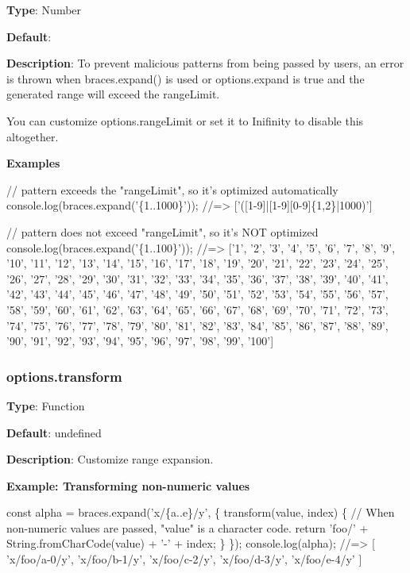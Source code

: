 {\bfseries Type}\+: {\ttfamily Number}

{\bfseries Default}\+: {}

{\bfseries Description}\+: To prevent malicious patterns from being passed by users, an error is thrown when {\ttfamily braces.\+expand()} is used or {\ttfamily options.\+expand} is true and the generated range will exceed the {\ttfamily range\+Limit}.

You can customize {\ttfamily options.\+range\+Limit} or set it to {\ttfamily Inifinity} to disable this altogether.

{\bfseries Examples}


\begin{DoxyCode}
// pattern exceeds the "rangeLimit", so it's optimized automatically
console.log(braces.expand('\{1..1000\}'));
//=> ['([1-9]|[1-9][0-9]\{1,2\}|1000)']

// pattern does not exceed "rangeLimit", so it's NOT optimized
console.log(braces.expand('\{1..100\}'));
//=> ['1', '2', '3', '4', '5', '6', '7', '8', '9', '10', '11', '12', '13', '14', '15', '16', '17', '18',
       '19', '20', '21', '22', '23', '24', '25', '26', '27', '28', '29', '30', '31', '32', '33', '34', '35', '36',
       '37', '38', '39', '40', '41', '42', '43', '44', '45', '46', '47', '48', '49', '50', '51', '52', '53', '54',
       '55', '56', '57', '58', '59', '60', '61', '62', '63', '64', '65', '66', '67', '68', '69', '70', '71', '72',
       '73', '74', '75', '76', '77', '78', '79', '80', '81', '82', '83', '84', '85', '86', '87', '88', '89', '90',
       '91', '92', '93', '94', '95', '96', '97', '98', '99', '100']
\end{DoxyCode}


\subsubsection*{options.\+transform}

{\bfseries Type}\+: {\ttfamily Function}

{\bfseries Default}\+: {\ttfamily undefined}

{\bfseries Description}\+: Customize range expansion.

{\bfseries Example\+: Transforming non-\/numeric values}


\begin{DoxyCode}
const alpha = braces.expand('x/\{a..e\}/y', \{
  transform(value, index) \{
    // When non-numeric values are passed, "value" is a character code.
    return 'foo/' + String.fromCharCode(value) + '-' + index;
  \}
\});
console.log(alpha);
//=> [ 'x/foo/a-0/y', 'x/foo/b-1/y', 'x/foo/c-2/y', 'x/foo/d-3/y', 'x/foo/e-4/y' ]
\end{DoxyCode}


